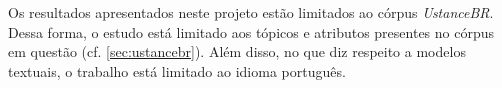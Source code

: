 \documentclass[
	12pt, oneside, a4paper, english, brazil
]{abntex2ppgsi}
\begin{document}
Os resultados apresentados neste projeto estão limitados ao córpus {\em UstanceBR}. Dessa forma, o estudo está limitado aos tópicos e atributos presentes no córpus em questão (cf. \ref{sec:ustancebr}). Além disso, no que diz respeito a modelos textuais, o trabalho está limitado ao idioma português.


\begin{apendicesenv}
\end{apendicesenv}
\begin{anexosenv}
\end{anexosenv}
\end{document}
